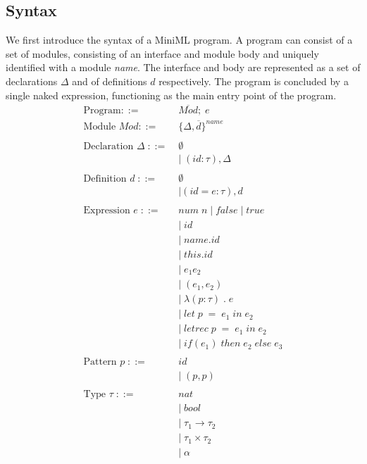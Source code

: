 \documentclass[10pt,a4paper,draft]{article}
\begin{document}
\begin{flushleft}
\section{Syntax}


\newcommand{\longspace}{\;\;\;\;\;\;}
We first introduce the syntax of a MiniML program. A program can consist of a set of modules, consisting of an interface and module body and uniquely identified with a module \textit{name}. The interface and body are represented as a set of declarations $\Delta$ and of definitions $d$ respectively.
The program is concluded by a single naked expression, functioning as the main entry point of the program.
\begin{align*}
\text{Program} ::= \; & \overline{\mathit{Mod}};\;e\\
\text{Module } \mathit{Mod} ::= \; &\lbrace \Delta, \overline{\mathit{d}}\rbrace^{name}\\ 
\\
\text{Declaration } \Delta \; ::=\; &\emptyset \\
&|\; (\mathit{id}:\tau), \Delta \\ 
\\
\text{Definition } d \; ::= \; & \emptyset\\
&| (\mathit{id}=e:\tau), \mathit{d}\\
\\
\text{Expression }e \; ::= \; &\mathit{num \; n \;} | \; \mathit{false} \; | \; \mathit{true} \\
&|\;\mathit{id}  \\
&|\;\mathit{name.id} \\
&|\;\mathit{this.id} \\
&|\;e_{1}e_{2} \\
&|\;(e_{1},e_{2}) \\
&|\;\lambda(p:\tau)\;.\;e \\
&|\;\mathit{let }\; p \; = \; e_{1} \; in \; e_{2} \\
&|\;\mathit{letrec} \; p \; = \; e_{1} \; in \; e_{2} \\
&|\; \mathit{if(e_{1}) \; then \; e_{2} \; else \; e_{3}}\\
\\
\text{Pattern }p \; ::= \; & \mathit{id} \\
&| \; (p,p)\\
\\
\text{Type }\tau \; ::= \; &nat \\
&| \; \mathit{bool} \\
&| \; \tau_{1} \rightarrow \tau_{2} \\
&| \; \tau_{1} \times \tau_{2} \\
&| \; \alpha \\
\end{align*}


\end{flushleft}
\end{document}
